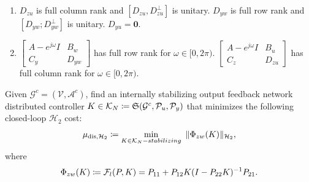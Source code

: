 \begin{opt}
\begin{assumption}\label{ass::statespace}
\begin{enumerate}
    \item \(D_{zu}\) is full column rank and \([D_{zu},D_{zu}^\perp]\) is unitary. \(D_{yw}\) is full row rank and \([D_{yw};D_{yw}^\perp]\) is unitary. \(D_{yu}=\mathbf{0}\).
    \item \(\left[\begin{array}{cc}
        A-e^{j\omega}  I & B_w \\
        C_y & D_{yw}
    \end{array}\right]\) has full row rank for \(\omega\in[0,2\pi)\).
     \(\left[\begin{array}{cc}
        A-e^{j\omega}  I & B_u \\
        C_z & D_{zu}
    \end{array}\right]\) has full column rank for \(\omega\in[0,2\pi)\).
\end{enumerate}
\end{assumption}
Given $\mathcal{G}^c=(\mathcal{V},\mathcal{A}^c)$,
find an internally stabilizing output feedback network distributed controller \(K\in {\cal K}_N \coloneqq \mathfrak{S}(\mathcal{G}^c, \mathcal{P}_u, \mathcal{P}_y)\)  that minimizes the following closed-loop \(\mathcal{H}_2\) cost:
\begin{equation}
    \mu_{\mathrm{dis},\mathcal{H}_2} \coloneqq  \displaystyle\min_{K\in {\cal K}_N-stabilizing}\ \|\Phi_{zw}(K)\|_{\mathcal{H}_2}, 
\end{equation}
where 
\begin{equation}\label{eqn::Phi_K}
\Phi_{zw}(K) \coloneqq {\mathcal{F}_l}(P,K) = P_{11}+P_{12} K(I-P_{22}K)^{-1} P_{21}.
\end{equation}
\end{opt}





